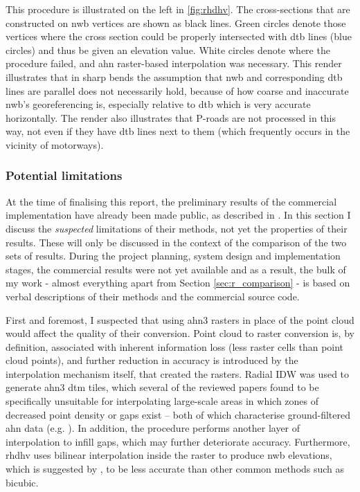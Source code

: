 This procedure is illustrated on the left in \ref{fig:rhdhv}. The cross-sections that are constructed on \ac{nwb} vertices are shown as black lines. Green circles denote those vertices where the cross section could be properly intersected with \ac{dtb} lines (blue circles) and thus be given an elevation value. White circles denote where the procedure failed, and \ac{ahn} raster-based interpolation was necessary. This render illustrates that in sharp bends the assumption that \ac{nwb} and corresponding \ac{dtb} lines are parallel does not necessarily hold, because of how coarse and inaccurate \ac{nwb}'s georeferencing is, especially relative to \ac{dtb} which is very accurate horizontally. The render also illustrates that P-roads are not processed in this way, not even if they have \ac{dtb} lines next to them (which frequently occurs in the vicinity of motorways).

\subsubsection{Potential limitations}

At the time of finalising this report, the preliminary results of the commercial implementation have already been made public, as described in \cite{nwb_hoogte}. In this section I discuss the \textit{suspected} limitations of their methods, not yet the properties of their results. These will only be discussed in the context of the comparison of the two sets of results. During the project planning, system design and implementation stages, the commercial results were not yet available and as a result, the bulk of my work - almost everything apart from Section \ref{sec:r_comparison} - is based on verbal descriptions of their methods and the commercial source code.

First and foremost, I suspected that using \ac{ahn3} rasters in place of the point cloud would affect the quality of their conversion. Point cloud to raster conversion is, by definition, associated with inherent information loss (less raster cells than point cloud points), and further reduction in accuracy is introduced by the interpolation mechanism itself, that created the rasters. Radial IDW was used to generate \ac{ahn3} \ac{dtm} tiles, which several of the reviewed papers found to be specifically unsuitable for interpolating large-scale areas in which zones of decreased point density or gaps exist – both of which characterise ground-filtered \ac{ahn} data (e.g. \cite{guo_etal_2010}). In addition, the procedure performs another layer of interpolation to infill gaps, which may further deteriorate accuracy. Furthermore, \ac{rhdhv} uses bilinear interpolation inside the raster to produce \ac{nwb} elevations, which is suggested by \cite{shi_etal_2005}, to be less accurate than other common methods such as bicubic.

